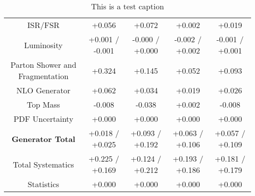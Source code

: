 \begin{table}[htbp]
\begin{center}
\begin{tabular}{|c|c|c|c|c|}
ISR/FSR                               &+0.056              & +0.072              & +0.002              & +0.019             \\
Luminosity                            &+0.001   / -0.001   & -0.000   / +0.000   & -0.002   / +0.002   & -0.001   / +0.001  \\
Parton Shower and Fragmentation       &+0.324              & +0.145              & +0.052              & +0.093             \\
NLO Generator                         &+0.062              & +0.034              & +0.019              & +0.026             \\
Top Mass                              &-0.008              & -0.038              & +0.002              & -0.008             \\
PDF Uncertainty                       &+0.000              & +0.000              & +0.000              & +0.000             \\
\hline
\textbf{Generator Total}              &+0.018   / +0.025   & +0.093   / +0.192   & +0.063   / +0.106   & +0.057   / +0.109  \\
\hline
\hline
Total Systematics                     &+0.225   / +0.169   & +0.124   / +0.212   & +0.193   / +0.186   & +0.181   / +0.179  \\
Statistics                            &+0.000              & +0.000              & +0.000              & +0.000             \\
\hline
  \end{tabular}
  \end{center} 
  \label{tab:fsm_nominal_sratio}
  \caption{This is a test caption}
\end{table}
 
 

